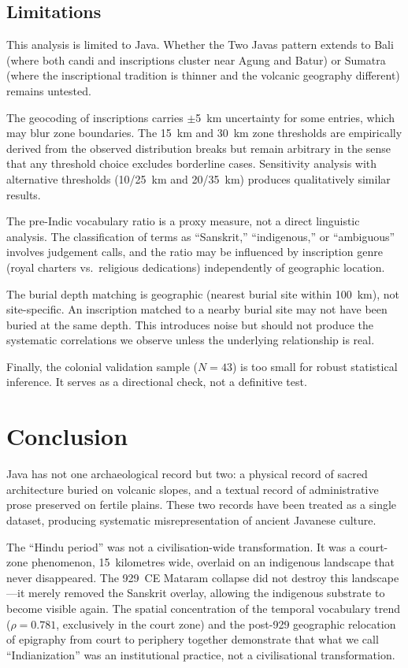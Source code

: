 \documentclass[12pt]{article}
\begin{document}
\subsection{Limitations}

This analysis is limited to Java.
Whether the Two Javas pattern extends to Bali (where both candi and inscriptions cluster near Agung and Batur) or Sumatra (where the inscriptional tradition is thinner and the volcanic geography different) remains untested.

The geocoding of inscriptions carries $\pm$5~km uncertainty for some entries, which may blur zone boundaries.
The 15~km and 30~km zone thresholds are empirically derived from the observed distribution breaks but remain arbitrary in the sense that any threshold choice excludes borderline cases.
Sensitivity analysis with alternative thresholds (10/25~km and 20/35~km) produces qualitatively similar results.

The pre-Indic vocabulary ratio is a proxy measure, not a direct linguistic analysis.
The classification of terms as ``Sanskrit,'' ``indigenous,'' or ``ambiguous'' involves judgement calls, and the ratio may be influenced by inscription genre (royal charters vs.\ religious dedications) independently of geographic location.

The burial depth matching is geographic (nearest burial site within 100~km), not site-specific.
An inscription matched to a nearby burial site may not have been buried at the same depth.
This introduces noise but should not produce the systematic correlations we observe unless the underlying relationship is real.

Finally, the colonial validation sample ($N = 43$) is too small for robust statistical inference.
It serves as a directional check, not a definitive test.


\section{Conclusion}

Java has not one archaeological record but two: a physical record of sacred architecture buried on volcanic slopes, and a textual record of administrative prose preserved on fertile plains.
These two records have been treated as a single dataset, producing systematic misrepresentation of ancient Javanese culture.

The ``Hindu period'' was not a civilisation-wide transformation.
It was a court-zone phenomenon, 15~kilometres wide, overlaid on an indigenous landscape that never disappeared.
The 929~CE Mataram collapse did not destroy this landscape---it merely removed the Sanskrit overlay, allowing the indigenous substrate to become visible again.
The spatial concentration of the temporal vocabulary trend ($\rho = 0.781$, exclusively in the court zone) and the post-929 geographic relocation of epigraphy from court to periphery together demonstrate that what we call ``Indianization'' was an institutional practice, not a civilisational transformation.
\end{document}
